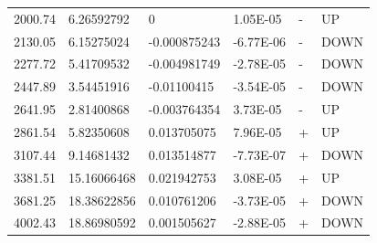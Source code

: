 \documentclass{article}
\begin{document}
\begin{table}[]
\begin{tabular}{@{}llllll@{}}
2000.74      & 6.26592792       & 0                & 1.05E-05  & -    & UP      \\
2130.05      & 6.15275024       & -0.000875243     & -6.77E-06 & -    & DOWN    \\
2277.72      & 5.41709532       & -0.004981749     & -2.78E-05 & -    & DOWN    \\
2447.89      & 3.54451916       & -0.01100415      & -3.54E-05 & -    & DOWN    \\
2641.95      & 2.81400868       & -0.003764354     & 3.73E-05  & -    & UP      \\
2861.54      & 5.82350608       & 0.013705075      & 7.96E-05  & +    & UP      \\
3107.44      & 9.14681432       & 0.013514877      & -7.73E-07 & +    & DOWN    \\
3381.51      & 15.16066468      & 0.021942753      & 3.08E-05  & +    & UP      \\
3681.25      & 18.38622856      & 0.010761206      & -3.73E-05 & +    & DOWN    \\
4002.43      & 18.86980592      & 0.001505627      & -2.88E-05 & +    & DOWN    \\ \bottomrule
\end{tabular}
\end{table}
\end{document}
